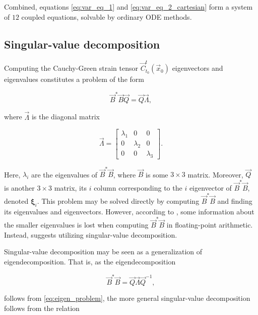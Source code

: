 \noindent Combined, equations \eqref{eq:var_eq_1} and \eqref{eq:var_eq_2_cartesian} form a system of $12$ coupled equations, solvable by ordinary ODE methods. 

\subsection{Singular-value decomposition}\label{sec:SVD}

Computing the Cauchy-Green strain tensor $\vec{C}_{t_0}^t(\vec{x}_0)$ eigenvectors and eigenvalues constitutes a problem of the form

\begin{equation}\label{eq:eigen_problem}
\vec{B}^*\vec{B}\vec{Q} = \vec{Q}\vec{\Lambda},
\end{equation}

\noindent where $\vec{\Lambda}$ is the diagonal matrix 

\begin{equation}
	\vec{\Lambda} =
	\begin{bmatrix}
		\lambda_1 & 0 & 0 \\[2ex]
		0 & \lambda_2 & 0 \\[2ex]
		0 & 0 & \lambda_3
	\end{bmatrix}.
\end{equation}

\noindent Here, $\lambda_i$ are the eigenvalues of $\vec{B}^*\vec{B}$, where $\vec{B}$ is some $3\times 3$ matrix. Moreover, $\vec{Q}$ is another $3\times 3$ matrix, its $i$ column corresponding to the $i$ eigenvector of $\vec{B}^*\vec{B}$, denoted $\bm{\xi}_i$. This problem may be solved directly by computing $\vec{B}^*\vec{B}$ and finding its eigenvalues and eigenvectors. However, according to \cite{Watkins05}, some information about the smaller eigenvalues is lost when computing $\vec{B}^*\vec{B}$ in floating-point arithmetic. Instead, \cite{Watkins05} suggests utilizing singular-value decomposition.

Singular-value decomposition may be seen as a generalization of eigendecomposition. That is, as the eigendecomposition

\begin{equation}\label{eq:eigendecomposition}
\vec{B}^*\vec{B} = \vec{Q}\vec{\Lambda}\vec{Q}^{-1},
\end{equation}

\noindent follows from \eqref{eq:eigen_problem}, the more general singular-value decomposition follows from the relation

